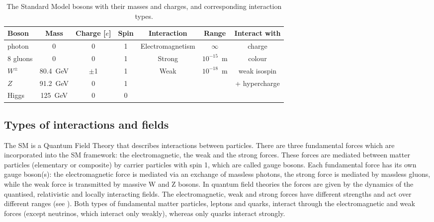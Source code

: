 \begin{table}[]
\begin{center}
{
\begin{tabular}{|l|c|c|c|c|c|c|}\cline{1-7}
 Boson & Mass &  Charge [$e$] & Spin  & Interaction & Range & Interact with \\ \hline
    photon  &  0  &  0 & 1 &  Electromagnetism & $ \infty $  &  charge \\ \hline
  8 gluons  &  0  &  0 & 1 &  Strong & $10^{-15}$~m &  colour \\ \hline 
    $W^{\pm}$   &  80.4~GeV  &  $\pm$1 & 1 &  \multirow{2}{*}{Weak}  & \multirow{2}{*}{$10^{-18}$~m} & weak isospin  \\
    $Z$   &  91.2~GeV  &  0 & 1 &  &  & + hypercharge \\ \hline
    Higgs   &  125~GeV  &  0 & 0 &  &  &   \\ 
\hline
\end{tabular}
}
\caption{\label{tab:bosons}The Standard Model bosons with their masses and charges, and corresponding interaction types. }
\end{center}
\end{table}




\subsection{Types of interactions and fields}

The SM is a Quantum Field Theory that describes interactions between particles.
There are three fundamental forces which are incorporated into the SM framework: the electromagnetic, the weak and the strong forces. These forces are mediated between matter particles (elementary or composite) by carrier particles with spin 1, which are called gauge bosons.
Each fundamental force has its own gauge boson(s): the electromagnetic force is mediated via an exchange of massless photons, the strong force is mediated by massless gluons, while the weak force is transmitted by massive W and Z bosons.
In quantum field theories the forces are given by the dynamics of the quantised, relativistic and locally interacting fields.
The electromagnetic, weak and strong forces have different strengths and act over different ranges (see ). 
Both types of fundamental matter particles, leptons and quarks, interact through the electromagnetic and weak forces (except neutrinos, which interact only weakly), whereas only quarks interact strongly.

